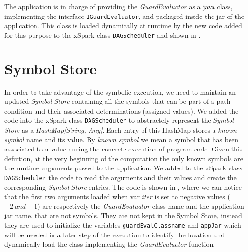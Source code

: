 The application is in charge of providing the \textit{GuardEvaluator} as a java class, implementing the interface \texttt{IGuardEvaluator}, and packaged inside the jar of the application. This class is loaded dynamically at runtime by the new code added for this purpose to the xSpark class \texttt{DAGScheduler} and shown in .


\section{Symbol Store}\label{sec:symbol_store}
In order to take advantage of the symbolic execution, we need to maintain an updated   \textit{Symbol Store} containing all the symbols that can be part of a path condition and their associated determinations (assigned values). We added the code into the xSpark class \texttt{DAGScheduler} to abstractely represent the \textit{Symbol Store} as a  \textit{HashMap[String, Any]}. Each entry of this HashMap stores a \textit{known symbol} name and its value. By \textit{known symbol} we mean a symbol that has been associated to a value during the concrete execution of program code. Given this defintion, at the very beginning of the computation the only known symbols are the runtime arguments passed to the application. We added to the xSpark class \texttt{DAGScheduler} the code to read the arguments and their values and create the corresponding \textit{Symbol Store} entries. The code is shown in , where we can notice that the first two arguments loaded when var \textit{iter} is set to negative values ($-2\ and -1$) are respectively the \textit{GuardEvaluator} class name and the application jar name, that are not symbols. They are not kept in the Symbol Store, instead they are used to initialize the variables \texttt{guardEvalClassname} and \texttt{appJar} which will be needed in a later step of the execution to identify the location and dynamically load the class implementing the \textit{GuardEvaluator} function.


